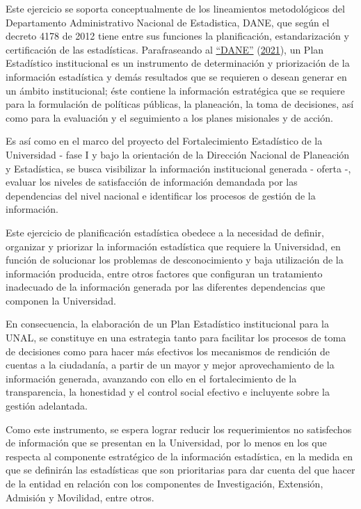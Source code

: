 \documentclass[
]{book}
\begin{document}
Este ejercicio se soporta conceptualmente de los lineamientos metodológicos del Departamento Administrativo Nacional de Estadistica, DANE, que según el decreto 4178 de 2012 tiene entre sus funciones la planificación, estandarización y certificación de las estadísticas. Parafraseando al \protect\hyperlink{ref-BibEntry2021Apr}{{``{DANE}''}} (\protect\hyperlink{ref-BibEntry2021Apr}{2021}), un Plan Estadístico institucional es un instrumento de determinación y priorización de la información estadística y demás resultados que se requieren o desean generar en un ámbito institucional; éste contiene la información estratégica que se requiere para la formulación de políticas públicas, la planeación, la toma de decisiones, así como para la evaluación y el seguimiento a los planes misionales y de acción.

Es así como en el marco del proyecto del Fortalecimiento Estadístico de la Universidad - fase I y bajo la orientación de la Dirección Nacional de Planeación y Estadística, se busca visibilizar la información institucional generada - oferta -, evaluar los niveles de satisfacción de información demandada por las dependencias del nivel nacional e identificar los procesos de gestión de la información.

Este ejercicio de planificación estadística obedece a la necesidad de definir, organizar y priorizar la información estadística que requiere la Universidad, en función de solucionar los problemas de desconocimiento y baja utilización de la información producida, entre otros factores que configuran un tratamiento inadecuado de la información generada por las diferentes dependencias que componen la Universidad.

En consecuencia, la elaboración de un Plan Estadístico institucional para la UNAL, se constituye en una estrategia tanto para facilitar los procesos de toma de decisiones como para hacer más efectivos los mecanismos de rendición de cuentas a la ciudadanía, a partir de un mayor y mejor aprovechamiento de la información generada, avanzando con ello en el fortalecimiento de la transparencia, la honestidad y el control social efectivo e incluyente sobre la gestión adelantada.

Como este instrumento, se espera lograr reducir los requerimientos no satisfechos de información que se presentan en la Universidad, por lo menos en los que respecta al componente estratégico de la información estadística, en la medida en que se definirán las estadísticas que son prioritarias para dar cuenta del que hacer de la entidad en relación con los componentes de Investigación, Extensión, Admisión y Movilidad, entre otros.
\end{document}
